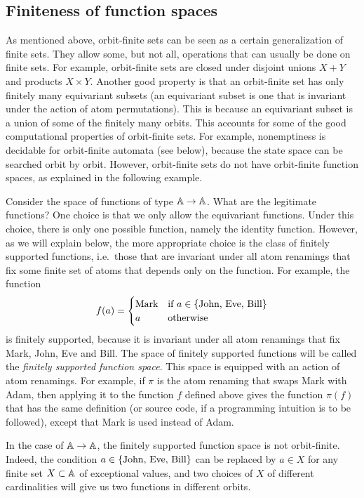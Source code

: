 
\subsection{Finiteness of function spaces}
\label{sec:orbit-finite-function-spaces}
As mentioned above, orbit-finite sets can be seen as  a certain generalization of finite sets. They allow some, but not all, operations that can usually be done on finite sets. For example, orbit-finite sets are closed under disjoint unions $X + Y$ and products $X \times Y$.  Another good property is that an orbit-finite set has only finitely many equivariant subsets (an equivariant subset is one that is invariant under the action of atom permutations). This is because an equivariant subset is a union of some of the finitely many orbits. This accounts for some of the good computational properties of orbit-finite sets. For example, nonemptiness is decidable for orbit-finite automata (see below), because the state space can be searched orbit by orbit.
However, orbit-finite sets do not have orbit-finite function spaces, as explained in the following example. 

\begin{example}
    Consider the space of functions of type $\mathbb A \to \mathbb A$. What are the legitimate functions? One choice is that we only allow the equivariant functions. Under this choice, there is only one possible function,  namely the identity function. However, as we will explain below, the more appropriate choice is the class of finitely supported functions, i.e.~those that are invariant under all atom renamings that fix some finite set of atoms that depends only on the function. For example,  the  function
    \begin{align*}
    f(a) = \begin{cases}
        \text{Mark} & \text{if $a \in \{\text{John, Eve, Bill}\}$} \\
        a & \text{otherwise}
    \end{cases}
    \end{align*}
    is finitely supported, because it is invariant under all atom renamings that fix Mark, John, Eve and Bill. The space of finitely supported functions will be called the \emph{finitely supported function space}. This space is equipped with an action of atom renamings. For example, if $\pi$ is the atom renaming that swaps Mark with Adam, then applying it to the function $f$ defined above gives the function $\pi(f)$ that has the same definition (or source code, if a programming intuition is to be followed), except that Mark is used instead of Adam.

    In the case of $\mathbb A \to \mathbb A$, the finitely supported function space is not orbit-finite. Indeed, the condition $a \in \{\text{John, Eve, Bill}\}$ can be replaced by $a \in X$ for any finite set $X \subset \mathbb A$ of exceptional values, and two choices of $X$ of different cardinalities will give us two functions in different orbits. \exampleend
\end{example}

